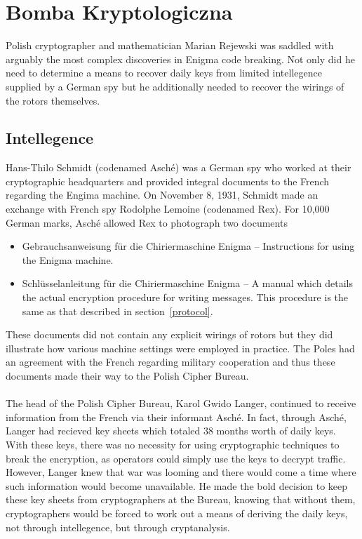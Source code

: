 \chapter{Bomba Kryptologiczna}

Polish cryptographer and mathematician Marian Rejewski was saddled with arguably the most complex discoveries in
Enigma code breaking. Not only did he need to determine a means to
recover daily keys from limited intellegence supplied by a German spy but he
additionally needed to recover the wirings of the rotors themselves.

\section{Intellegence}

Hans-Thilo Schmidt (codenamed Asché) was a German spy who worked at their cryptographic headquarters and provided integral documents to the French regarding the Engima machine. On November 8, 1931, Schmidt made an exchange with French spy Rodolphe Lemoine (codenamed Rex). For 10,000 German marks,  Asché allowed Rex to photograph two documents
\begin{itemize}
	\item Gebrauchsanweisung für die Chiriermaschine
	      Enigma -- Instructions for using the Enigma machine.
	\item Schlüsselanleitung für die Chiriermaschine Enigma -- A manual which details the actual encryption procedure for writing messages. This procedure is the same as that described in section~\ref{protocol}.
\end{itemize}
These documents did not contain any explicit wirings of rotors but they did illustrate how various machine settings were employed in practice. The Poles had an agreement with the French regarding military cooperation and thus these documents made their way to the Polish Cipher Bureau.
\\\\The head of the Polish Cipher Bureau, Karol Gwido Langer, continued to receive information from the French via their informant Asché. In fact, through Asché, Langer had recieved key sheets which totaled 38 months worth of daily keys. With these keys, there was no necessity for using cryptographic techniques to break the encryption, as operators could simply use the keys to decrypt traffic. However, Langer knew that war was looming and there would come a time where such information would become unavailable. He made the bold decision to keep these key sheets from cryptographers at the Bureau, knowing that without them, cryptographers would be forced to work out a means of deriving the daily keys, not through intellegence, but through cryptanalysis.
